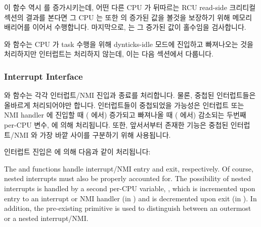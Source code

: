 이 함수 역시  를 증가시키는데, 어떤 다른 CPU 가
뒤따르는 RCU read-side 크리티컬 섹션의 결과를 본다면 그 CPU 는 또한
 의 증가된 값을 볼것을 보장하기 위해 메모리
배리어를 이어서 수행합니다.
마지막으로,  는 그 증가된 값이 홀수임을 검사합니다.

 와  함수는 CPU 가 task 수행을 위해
dynticks-idle 모드에 진입하고 빠져나오는 것을 처리하지만 인터럽트는 처리하지
않는데, 이는 다음 섹션에서 다룹니다.

\iffalse

This function again increments \co{dynticks_progress_counter},
but follows it with a memory barrier to ensure that if any other CPU
sees the result of any subsequent RCU read-side critical section,
then that other CPU will also see the incremented value of
\co{dynticks_progress_counter}.
Finally, \co{rcu_exit_nohz()} checks that the result of the
increment is an odd value.

The \co{rcu_enter_nohz()} and \co{rcu_exit_nohz()}
functions handle the case where a CPU enters and exits dynticks-idle
mode due to task execution, but does not handle interrupts, which are
covered in the following section.

\fi

\subsubsection{Interrupt Interface}
\label{sec:formal:Interrupt Interface}

 와  함수는 각각 인터럽트/NMI 진입과
종료를 처리합니다.
물론, 중첩된 인터럽트들은 올바르게 처리되어야만 합니다.
인터럽트들이 중첩되었을 가능성은 인터럽트 또는 NMI handler 에 진입할 때
( 에서) 증가되고 빠져나올 때 ( 에서)
감소되는 두번째 per-CPU 변수,  에 의해 처리됩니다.
또한, 앞서서부터 존재한  기능은 중첩된 인터럽트/NMI 와 가장
바깥 사이를 구분하기 위해 사용됩니다.

인터럽트 진입은  에 의해 다음과 같이 처리됩니다:

\iffalse

The  and 
functions handle interrupt/NMI entry and exit, respectively.
Of course, nested interrupts must also be properly accounted for.
The possibility of nested interrupts is handled by a second per-CPU
variable, , which is incremented upon
entry to an interrupt or NMI handler (in )
and is decremented upon exit (in ).
In addition, the pre-existing  primitive is
used to distinguish between an outermost or a nested interrupt/NMI\@.

